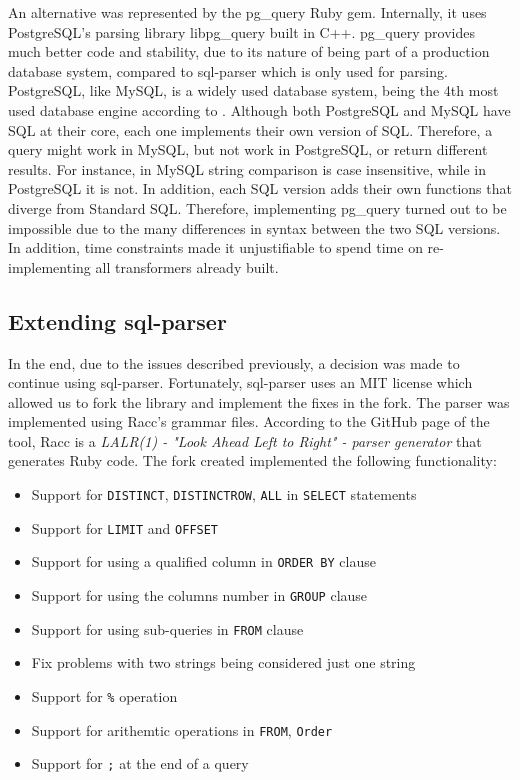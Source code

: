 An alternative was represented by the pg\_query Ruby gem. Internally, it uses PostgreSQL's parsing library libpg\_query built in C++. pg\_query provides much better code and stability, due to its nature of being part of a production database system, compared to sql-parser which is only used for parsing. PostgreSQL, like MySQL, is a widely used database system, being the 4th most used database engine according to \cite{db_engine:statistics}. Although both PostgreSQL and MySQL have SQL at their core, each one implements their own version of SQL. Therefore, a query might work in MySQL, but not work in PostgreSQL, or return different results. For instance, in MySQL string comparison is case insensitive, while in PostgreSQL it is not. In addition, each SQL version adds their own functions that diverge from Standard SQL. Therefore, implementing pg\_query turned out to be impossible due to the many differences in syntax between the two SQL versions. In addition, time constraints made it unjustifiable to spend time on re-implementing all transformers already built.

\subsection{Extending sql-parser}

In the end, due to the issues described previously, a decision was made to continue using sql-parser. Fortunately, sql-parser uses an MIT license which allowed us to fork the library and implement the fixes in the fork. The parser was implemented using Racc's grammar files. According to the GitHub page of the tool, Racc is a \textit{LALR(1) - "Look Ahead Left to Right" -  parser generator} that generates Ruby code. The fork created implemented the following functionality:
\begin{itemize}
    \item Support for \texttt{DISTINCT}, \texttt{DISTINCTROW}, \texttt{ALL} in \texttt{SELECT} statements
    \item Support for \texttt{LIMIT} and \texttt{OFFSET}
    \item Support for using a qualified column in \texttt{ORDER BY} clause
    \item Support for using the columns number in \texttt{GROUP} clause
    \item Support for using sub-queries in \texttt{FROM} clause
    \item Fix problems with two strings being considered just one string
    \item Support for \texttt{\%} operation
    \item Support for arithemtic operations in \texttt{FROM}, \texttt{Order}
    \item Support for \texttt{;} at the end of a query
\end{itemize}

